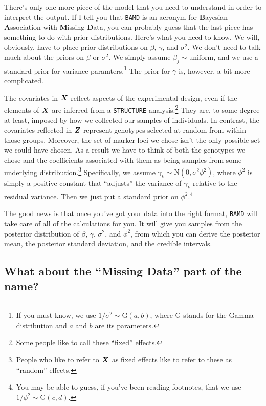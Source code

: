 There's only one more piece of the model that you need to understand
in order to interpret the output. If I tell you that {\tt BAMD} is an
acronym for {\bf B}ayesian {\bf A}ssociation with {\bf M}issing {\bf
  D}ata, you can probably guess that the last piece has something to
do with prior distributions. Here's what you need to know. We will,
obviously, have to place prior distributions on $\beta$, $\gamma$, and
$\sigma^2$. We don't need to talk much about the priors on $\beta$ or
$\sigma^2$. We simply assume $\beta_j \sim \mbox{uniform}$, and we use
a standard prior for variance paramters.\footnote{If you must know, we
  use $1/\sigma^2 \sim \mbox{G}(a, b)$, where $\mbox{G}$ stands for
  the Gamma distribution and $a$ and $b$ are its parameters.} The
prior for $\gamma$ is, however, a bit more
complicated.

The covariates in $\mbox{\boldmath$X$}$ reflect aspects of the
experimental design, even if the elements of $\mbox{\boldmath$X$}$ are
inferred from a {\tt STRUCTURE} analysis.\footnote{Some people like to
  call these ``fixed'' effects.} They are, to some degree at least,
imposed by how we collected our samples of individuals. In contrast,
the covariates reflected in $\mbox{\boldmath$Z$}$ represent genotypes
selected at random from within those groups. Moreover, the set of
marker loci we chose isn't the only possible set we could have
chosen. As a result we have to think of both the genotypes we chose
and the coefficients associated with them as being samples from some
underlying distribution.\footnote{People who like to refer to
  $\mbox{\boldmath$X$}$ as fixed effects like to refer to these as
  ``random'' effects.} Specifically, we assume $\gamma_k \sim
\mbox{N}(0, \sigma^2\phi^2)$, where $\phi^2$ is simply a positive
constant that ``adjusts'' the variance of $\gamma_k$ relative to the
residual variance. Then we just put a standard prior on
$\phi^2$.\footnote{You may be able to guess, if you've been reading
  footnotes, that we use $1/\phi^2 \sim \mbox{G}(c,d)$.}

The good news is that once you've got your data into the right format,
{\tt BAMD} will take care of all of the calculations for you. It will
give you samples from the posterior distribution of $\beta$, $\gamma$,
$\sigma^2$, and $\phi^2$, from which you can derive the posterior
mean, the posterior standard deviation, and the credible
intervals.

\subsection*{What about the ``Missing Data'' part of the name?}

